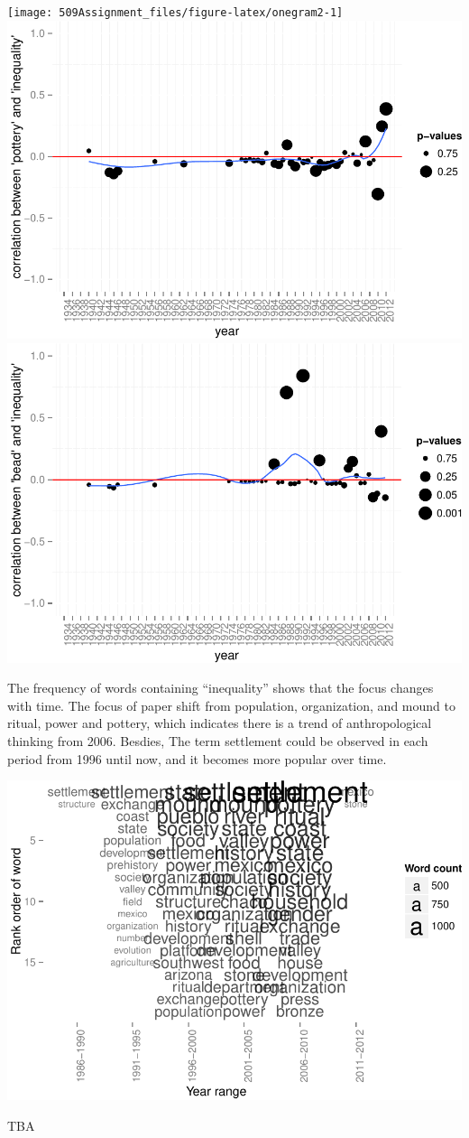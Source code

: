 \documentclass[10pt]{article}
\newenvironment{CodeChunk}{}{}
\begin{document}
\begin{CodeChunk}

\texttt{[image: 509Assignment\_files/figure-latex/onegram2-1]} 
\includegraphics{509Assignment_files/figure-latex/onegram2-2} 
\includegraphics{509Assignment_files/figure-latex/onegram2-3} \end{CodeChunk}

The frequency of words containing ``inequality'' shows that the focus
changes with time. The focus of paper shift from population,
organization, and mound to ritual, power and pottery, which indicates
there is a trend of anthropological thinking from 2006. Besdies, The
term settlement could be observed in each period from 1996 until now,
and it becomes more popular over time.

\begin{CodeChunk}

\includegraphics{509Assignment_files/figure-latex/onegram5-1} \end{CodeChunk}

TBA
\end{document}
